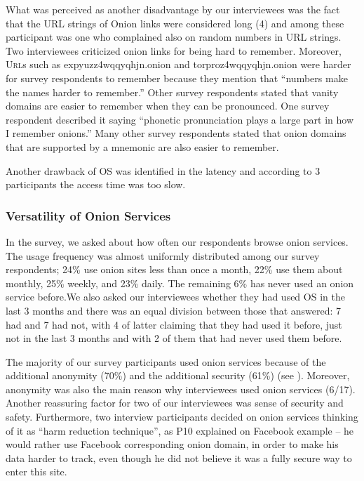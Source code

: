 What was perceived as another disadvantage by our interviewees was the fact that the URL strings of Onion links were considered long (4) and among these participant was one who complained also on random numbers in URL strings. Two interviewees criticized onion links for being hard to remember. Moreover, \textsc{Url}s such as expyuzz4wqqyqhjn.onion and torproz4wqqyqhjn.onion were
harder for survey respondents to remember because they mention that ``numbers make the
names harder to remember.''  Other survey respondents stated that vanity domains are easier to
remember when they can be pronounced.  One survey respondent described it saying 
``phonetic pronunciation plays a large part in how I remember onions.'' Many
other survey  respondents stated that onion domains that are supported by a mnemonic are
also easier to remember.  
 
 Another drawback of OS was identified in the latency and according to 3 participants the access time was too slow. 
\subsubsection{ Versatility of Onion Services }
In the survey, we asked about how often our respondents browse onion
services.  The usage frequency was almost uniformly distributed among our survey
respondents; 24\% use onion sites less than once a month, 22\% use them about
monthly, 25\% weekly, and 23\% daily.  The remaining 6\% has never used an onion
service before.We also asked our interviewees whether they had used OS in the last 3 months and there was an equal division between those that answered: 7 had and 7 had not, with 4 of latter claiming that they had used it before, just not in the last 3 months and with 2 of them that had never used them before.

The majority of our survey participants  used onion services
because of the additional anonymity (70\%) and the additional security (61\%) (see ). Moreover,  anonymity was also the main reason why interviewees used onion services (6/17). Another reassuring factor for two of our interviewees was sense of security and safety. Furthermore, two interview participants decided on onion services thinking of it as “harm reduction technique”, as P10 explained on Facebook example – he would rather use Facebook corresponding onion domain, in order to make his data harder to track, even though he did not believe it was a fully secure way to enter this site.

